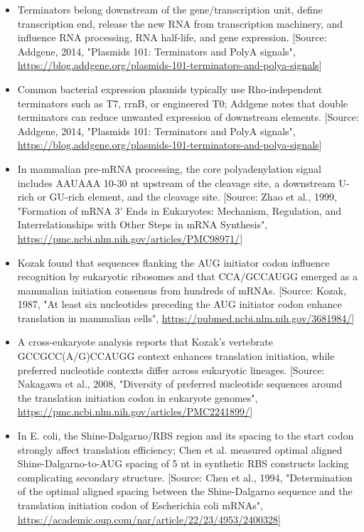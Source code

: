 \documentclass[11pt]{report}
\begin{document}
\begin{itemize}
\item Terminators belong downstream of the gene/transcription unit, define transcription end, release the new RNA from transcription machinery, and influence RNA processing, RNA half-life, and gene expression. [Source: Addgene, 2014, "Plasmids 101: Terminators and PolyA signals", \url{https://blog.addgene.org/plasmids-101-terminators-and-polya-signals}]
\item Common bacterial expression plasmids typically use Rho-independent terminators such as T7, rrnB, or engineered T0; Addgene notes that double terminators can reduce unwanted expression of downstream elements. [Source: Addgene, 2014, "Plasmids 101: Terminators and PolyA signals", \url{https://blog.addgene.org/plasmids-101-terminators-and-polya-signals}]
\item In mammalian pre-mRNA processing, the core polyadenylation signal includes AAUAAA 10-30 nt upstream of the cleavage site, a downstream U-rich or GU-rich element, and the cleavage site. [Source: Zhao et al., 1999, "Formation of mRNA 3' Ends in Eukaryotes: Mechanism, Regulation, and Interrelationships with Other Steps in mRNA Synthesis", \url{https://pmc.ncbi.nlm.nih.gov/articles/PMC98971/}]
\item Kozak found that sequences flanking the AUG initiator codon influence recognition by eukaryotic ribosomes and that CCA/GCCAUGG emerged as a mammalian initiation consensus from hundreds of mRNAs. [Source: Kozak, 1987, "At least six nucleotides preceding the AUG initiator codon enhance translation in mammalian cells", \url{https://pubmed.ncbi.nlm.nih.gov/3681984/}]
\item A cross-eukaryote analysis reports that Kozak's vertebrate GCCGCC(A/G)CCAUGG context enhances translation initiation, while preferred nucleotide contexts differ across eukaryotic lineages. [Source: Nakagawa et al., 2008, "Diversity of preferred nucleotide sequences around the translation initiation codon in eukaryote genomes", \url{https://pmc.ncbi.nlm.nih.gov/articles/PMC2241899/}]
\item In E. coli, the Shine-Dalgarno/RBS region and its spacing to the start codon strongly affect translation efficiency; Chen et al. measured optimal aligned Shine-Dalgarno-to-AUG spacing of 5 nt in synthetic RBS constructs lacking complicating secondary structure. [Source: Chen et al., 1994, "Determination of the optimal aligned spacing between the Shine-Dalgarno sequence and the translation initiation codon of Escherichia coli mRNAs", \url{https://academic.oup.com/nar/article/22/23/4953/2400328}]

\end{itemize}
\end{document}
